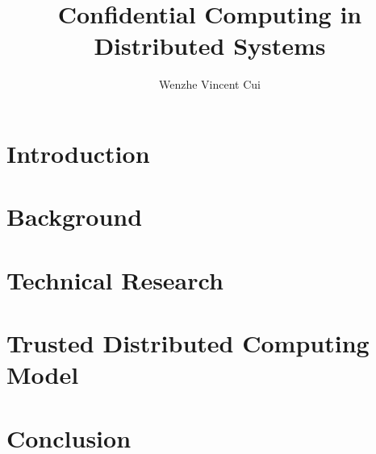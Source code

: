 \documentclass[oneside, english, draft]{sdqthesis}
\author{Wenzhe Vincent Cui}
\title{Confidential Computing in Distributed Systems}
\begin{document}
\setpdf

\maketitle

\frontmatter



\setcounter{page}{1}


\listoftodos
 



\tableofcontents

\listoffigures
\listoftables


\mainmatter

\chapter{Introduction}


\chapter{Background}


\chapter{Technical Research}
\label{ch:technical-research}




\chapter{Trusted Distributed Computing Model}
\label{ch:trusted-distributed-computing-model}


\chapter{Conclusion}



\nocite{*}
\printbibliography[heading=bibintoc]

%
\end{document}
